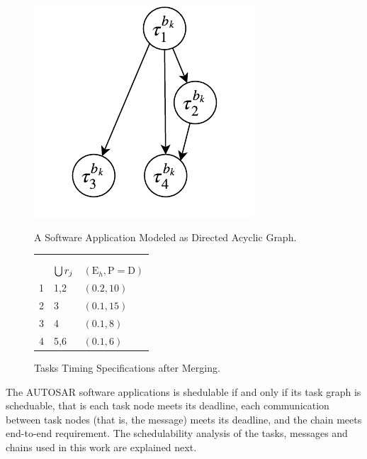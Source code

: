 \begin{figure}
\vspace{0pt}\raggedbottom
	\begin{minipage}{.475\textwidth}
		\centering
		\includegraphics[width=0.6\linewidth]{img/dag_tasks}
		\caption{A Software Application Modeled as Directed Acyclic Graph.}
		\label{fig_dag_tasks}
	\end{minipage}%
\hfill
	\begin{minipage}{0.475\textwidth}
	\centering
		\begin{tabular}{@{}lll@{}}
						&&\\
			&&\\
			\toprule
			\ttssb{\tau}&$\bigcup\ssb{r}[j]$&$(\mathrm{E}_h, \mathrm{P=D})$ \\ 
			\midrule
			1 & 1,2 &  $(0.2,10)$\\ 
			2& 3 &  $(0.1,15)$\\ 
			3& 4&  $(0.1,8)$\\ 
			4 & 5,6 &  $(0.1,6)$\\ 

			\bottomrule 
		\end{tabular}
		\caption{Tasks Timing Specifications after Merging.}
		\label{tbl_tasks_specs}
	\end{minipage}
\end{figure}


The AUTOSAR software applications is shedulable if and only if its task graph is scheduable, that is each task node meets its deadline, each communication between task nodes (that is, the message) meets its deadline, and the chain meets end-to-end requirement. The schedulability analysis of the tasks, messages and chains used in this work are explained next.

